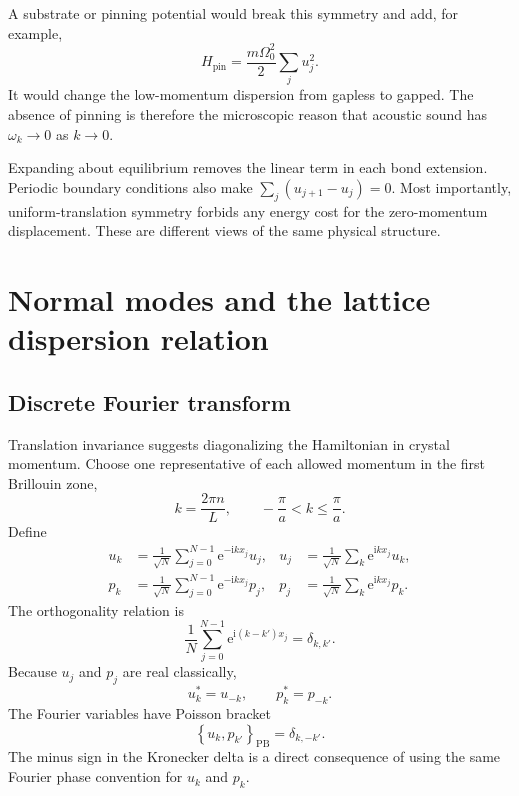 \documentclass[11pt]{article}
\newcommand{\e}{\mathrm{e}}
\newcommand{\ii}{\mathrm{i}}
\newcommand{\pb}[2]{\left\{#1,#2\right\}_{\mathrm{PB}}}
\begin{document}
A substrate or pinning potential would break this symmetry and add, for
example,
\begin{equation}
  H_{\mathrm{pin}}=\frac{m\Omega_0^2}{2}\sum_j u_j^2.
\end{equation}
It would change the low-momentum dispersion from gapless to gapped.  The
absence of pinning is therefore the microscopic reason that acoustic sound
has $\omega_k\to0$ as $k\to0$.

\begin{remarkbox}
Expanding about equilibrium removes the linear term in each bond extension.
Periodic boundary conditions also make
$\sum_j(u_{j+1}-u_j)=0$.  Most importantly, uniform-translation symmetry
forbids any energy cost for the zero-momentum displacement.  These are
different views of the same physical structure.
\end{remarkbox}

\section{Normal modes and the lattice dispersion relation}

\subsection{Discrete Fourier transform}

Translation invariance suggests diagonalizing the Hamiltonian in crystal
momentum.  Choose one representative of each allowed momentum in the first
Brillouin zone,
\begin{equation}
  k=\frac{2\pi n}{L},
  \qquad
  -\frac{\pi}{a}<k\leq\frac{\pi}{a}.
  \label{eq:allowedk}
\end{equation}
Define
\begin{align}
  u_k&=\frac{1}{\sqrt N}\sum_{j=0}^{N-1}
  \e^{-\ii kx_j}u_j,
  &
  u_j&=\frac{1}{\sqrt N}\sum_k \e^{\ii kx_j}u_k,
  \label{eq:DFTu}
  \\
  p_k&=\frac{1}{\sqrt N}\sum_{j=0}^{N-1}
  \e^{-\ii kx_j}p_j,
  &
  p_j&=\frac{1}{\sqrt N}\sum_k \e^{\ii kx_j}p_k.
  \label{eq:DFTp}
\end{align}
The orthogonality relation is
\begin{equation}
  \frac{1}{N}\sum_{j=0}^{N-1}
  \e^{\ii(k-k')x_j}=\delta_{k,k'}.
  \label{eq:DFTorthogonality}
\end{equation}
Because $u_j$ and $p_j$ are real classically,
\begin{equation}
  u_k^*=u_{-k},
  \qquad
  p_k^*=p_{-k}.
  \label{eq:reality}
\end{equation}
The Fourier variables have Poisson bracket
\begin{equation}
  \pb{u_k}{p_{k'}}=\delta_{k,-k'}.
  \label{eq:FourierPB}
\end{equation}
The minus sign in the Kronecker delta is a direct consequence of using the
same Fourier phase convention for $u_k$ and $p_k$.
\end{document}
